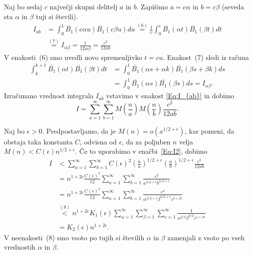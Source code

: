 \documentclass[mat1]{fmfdelo}
\begin{document}
Naj bo sedaj $c$ največji skupni delitelj $a$ in $b$. Zapišimo $a = c \alpha$ in $b = c \beta$ (seveda sta $\alpha$ in $\beta$ tuji si števili).
\begin{align}
I_{ab} &= \int_{0}^1 \bar{B_{1}}(c \alpha u) \bar{B_{1}}(c \beta u) du
	\stackrel{(6)}{=} \frac{1}{c} \int_{0}^c \bar{B_{1}}(\alpha t) \bar{B_{1}}(\beta t) dt \nonumber \\
	&\stackrel{(7)}{=} I_{\alpha \beta}
	= \frac{1}{12 \alpha \beta}
	= \frac{c^2}{12ab}
\end{align}
V enakosti~(6) smo uvedli novo spremenljivko $t=cu$.
Enakost~(7) sledi iz računa
\begin{align*}
\int_{k}^{k+1} \bar{B_{1}}(\alpha t) \bar{B_{1}}(\beta t) dt &= \int_{0}^{1} \bar{B_{1}}(\alpha s + \alpha k) \bar{B_{1}}(\beta s + \beta k) ds \\
 	&= \int_{0}^{1} \bar{B_{1}}(\alpha s) \bar{B_{1}}(\beta s) ds = I_{\alpha \beta}.
\end{align*}
%
Izračunano vrednost integrala $I_{ab}$ vstavimo v enakost \eqref{Eq:I_{ab}} in dobimo
\begin{equation}
\label{Eq:I2}
I = \sum_{a=1}^{\infty} \sum_{b=1}^{\infty} M \left(\frac{n}{a} \right) M \left(\frac{n}{b} \right) \frac{c^2}{12ab}.
\end{equation}

Naj bo $\epsilon>0$. Predpostavljamo, da je $M(n) = o(x^{1/2+\epsilon})$, kar pomeni, da obstaja taka konstanta $C$, odvisna od $\epsilon$, da za poljuben $n$ velja $M(n) < C(\epsilon) n^{1/2+\epsilon}$. Če to uporabimo v enačbi~\eqref{Eq:I2}, dobimo
\begin{align}
I &< \sum_{a=1}^{\infty} \sum_{b=1}^{\infty} C(\epsilon)^2 \left( \frac{n}{a} \right)^{1/2+\epsilon} \left( \frac{n}{b} \right)^{1/2+\epsilon} \frac{c^2}{12ab} \nonumber \\
  &= n^{1+2\epsilon} \frac{C(\epsilon)^2}{12} \sum_{a=1}^{\infty} \sum_{b=1}^{\infty} \frac{c^2}{a^{3/2+\epsilon} b^{3/2+\epsilon}} \nonumber \\
  &= n^{1+2\epsilon} \frac{C(\epsilon)^2}{12} \sum_{a=1}^{\infty} \sum_{b=1}^{\infty} \frac{c^2}{\alpha^{3/2+\epsilon} \beta^{3/2+\epsilon} c^{3+2\epsilon}} \nonumber \\
  &\stackrel{(8)}{<} n^{1+2\epsilon} K_{1}(\epsilon) \sum_{\alpha=1}^{\infty} \sum_{\beta=1}^{\infty} \sum_{c=1}^{\infty} \frac{1}{\alpha^{3/2} \beta^{3/2} c^{1+2\epsilon}} \nonumber \\
  &= K_{2}(\epsilon) n^{1+2\epsilon}.
\end{align}
V neenakosti~(8) smo vsoto po tujih si številih $\alpha$ in $\beta$ zamenjali z vsoto po vseh vrednostih $\alpha$ in $\beta$.
\end{document}
